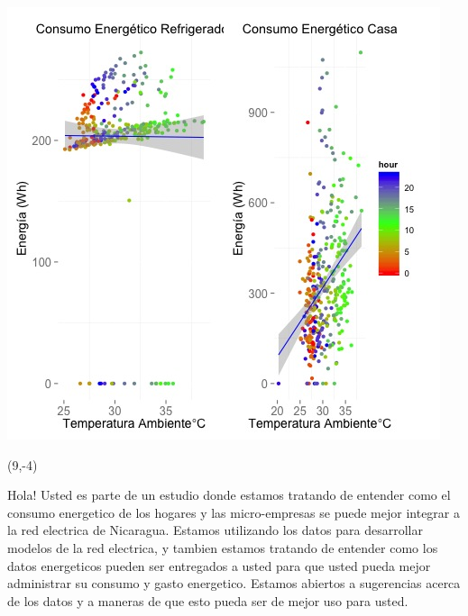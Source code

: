 \documentclass{article}\usepackage[]{graphicx}\usepackage[]{color}
\newenvironment{knitrout}{}{} %
\begin{document}
\begin{knitrout}
\color{fgcolor}
\includegraphics[scale=0.75]{figure/A13_correlaciones} 
\end{knitrout}

 \begin{textblock}{1}(9,-4)
\begin{minipage}{20em}
\begingroup

\endgroup
\end{minipage}
\end{textblock}

\vspace{70px}
\begin{knitrout}
Hola! Usted es parte de un estudio donde estamos tratando de entender como el consumo energetico de los hogares y las micro-empresas se puede mejor integrar a la red electrica de Nicaragua. Estamos utilizando los datos para desarrollar modelos de la red electrica, y tambien estamos tratando de entender como los datos energeticos pueden ser entregados a usted para que usted pueda mejor administrar su consumo y gasto energetico.  Estamos abiertos a sugerencias acerca de los datos y a maneras de que esto pueda ser de mejor uso para usted.
\end{knitrout}
\end{document}
